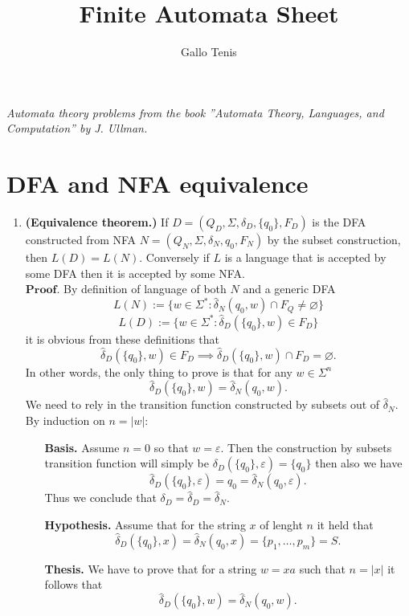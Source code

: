 \documentclass{article}
\title{Finite Automata Sheet}
\author{Gallo Tenis}
\newcommand{\D}{
    \hat{\delta}_{D}
}
\newcommand{\N}{
    \hat{\delta}_{N}
}
\newcommand{\DD}[2]{
    \hat{\delta}_{D}(\{#1\}, #2)
}
\newcommand{\NN}[2]{
    \hat{\delta}_{N}(#1, #2)
}
\theoremstyle{remark}
\begin{document}
\maketitle

\begin{center}
    \textit{
        Automata theory problems from the book ''Automata Theory, Languages, and Computation'' by J. Ullman.
    }
\end{center}
\section*{DFA and NFA equivalence}
\begin{enumerate}
    \item \textbf{(Equivalence theorem.)}
    If \( D = (Q_D, \Sigma, \delta_D, \{q_0\}, F_D) \) is the DFA constructed from NFA 
    \( N = (Q_N, \Sigma, \delta_N, q_0, F_N) \) by the subset construction, then \( L(D) = L(N) \).
    Conversely if $L$ is a language that is accepted by some DFA then it is accepted by some NFA.
    \\$\textbf{Proof.}$
    By definition of language of both $N$ and a generic DFA
    \[
    L(N) := \{w \in \Sigma^* : \hat{\delta}_N(q_0,w) \cap F_Q \neq \varnothing\}
    \]
    \[
    L(D) := \{w \in \Sigma^* : \hat{\delta}_D(\{q_0\},w) \in F_D\}
    \]
    it is obvious from these definitions that
    \[
    \DD{q_0}{w} \in F_D \implies \DD{q_0}{w} \cap F_D = \varnothing.
    \]
    In other words, the only thing to prove is that for any $w \in \Sigma^n$
    \[
        \DD{q_0}{w} = \NN{q_0}{w}.
    \]
    We need to rely in the transition function constructed by subsets out of $\N$.
    By induction on $n = \vert w \vert$:
    \begin{enumerate}
        \item[\textbf{Basis.}] Assume $n = 0$ so that $w = \varepsilon$. Then 
        the construction by subsets transition function will simply be $\delta_D(\{q_0\},\varepsilon) = \{q_0\}$ then 
        also we have
        \[
        \DD{q_0}{\varepsilon} = q_0 = \NN{q_0}{\varepsilon}.
        \]
        Thus we conclude that $\delta_D = \D = \N$.
        \item[\textbf{Hypothesis.}] Assume that for the string $x$ of lenght $n$ it held that 
        \[
        \DD{q_0}{x} = \NN{q_0}{x} = \{p_1,\dots, p_m\} = S.
        \]
        \item[\textbf{Thesis.}] We have to prove that for a string $w = xa$ such that $n = \vert x\vert$ it follows that 
        \[
        \DD{q_0}{w} = \NN{q_0}{w}.
\]
\end{enumerate}
\end{enumerate}
\end{document}
